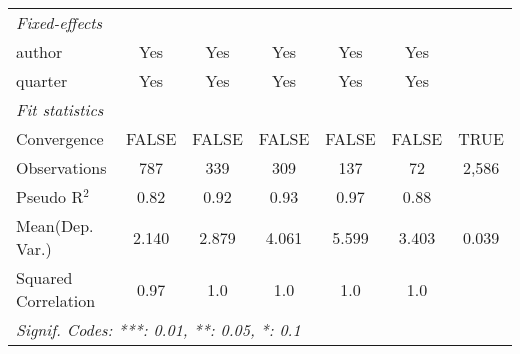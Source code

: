 \begin{tabular}{lcccccc}
   \midrule
   \emph{Fixed-effects}\\
   author                                                     & Yes          & Yes           & Yes          & Yes            & Yes            & \\  
   quarter                                                    & Yes          & Yes           & Yes          & Yes            & Yes            & \\  
   \midrule
   \emph{Fit statistics}\\
   Convergence                                                &FALSE         & FALSE         & FALSE        & FALSE          & FALSE          & TRUE\\  
   Observations                                               & 787          & 339           & 309          & 137            & 72             & 2,586\\  
   Pseudo R$^2$                                               & 0.82         & 0.92          & 0.93         & 0.97           & 0.88           & \\  
Mean(Dep. Var.) & 2.140 & 2.879 & 4.061 & 5.599 & 3.403 & 0.039 \\
   Squared Correlation                                        & 0.97         & 1.0           & 1.0          & 1.0            & 1.0            & \\  
   \midrule \midrule
   \multicolumn{7}{l}{\emph{Signif. Codes: ***: 0.01, **: 0.05, *: 0.1}}\\
\end{tabular}
\par\endgroup
